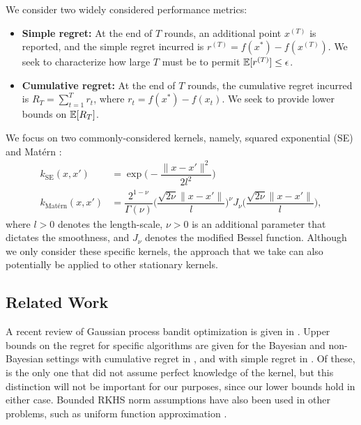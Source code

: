 \documentclass[english,onecolumn,final,11pt]{IEEEtran} %
\newcommand{\kSE}{k_{\text{SE}}}
\newcommand{\kMat}{k_{\text{Mat\'ern}}}
\begin{document}
We consider two widely considered performance metrics:
\begin{itemize}
    \item {\bf Simple regret:} At the end of $T$ rounds, an additional point $x^{(T)}$ is reported, and the simple regret incurred is $r^{(T)} = f(x^*) - f(x^{(T)})$.  We seek to characterize how large $T$ must be to permit $\mathbb{E}[r^{(T)}] \le \epsilon$.
    \item {\bf Cumulative regret:} At the end of $T$ rounds, the cumulative regret incurred is $R_T = \sum_{t=1}^T r_t$, where $r_t = f(x^*) - f(x_t)$.  We seek to provide lower bounds on $\mathbb{E}[R_T]$.
\end{itemize}

We focus on two commonly-considered kernels, namely, squared exponential (SE) and Mat\'ern \cite{Ras06}: 
\begin{align}
    \kSE(x,x') &= \exp \bigg(- \dfrac{\|x - x'\|^2}{2l^2} \bigg) \label{eq:kSE} \\ 
    \kMat(x,x') &= \dfrac{2^{1-\nu}}{\Gamma(\nu)} \bigg(\dfrac{\sqrt{2\nu}\|x - x'\|}{l}\bigg)^{\nu}  J_{\nu}\bigg(\dfrac{\sqrt{2 \nu}\|x - x'\|}{l} \bigg), \label{eq:kMat}
    \end{align}
where $l>0$ denotes the length-scale, $\nu > 0$ is an additional parameter that dictates the smoothness,  and $J_{\nu}$ denotes the modified Bessel function.  Although we only consider these specific kernels, the approach that we take can also potentially be applied to other stationary kernels.

\subsection{Related Work} \label{sec:previous_work}

A recent review of Gaussian process bandit optimization is given in \cite{Sha16}. Upper bounds on the regret for specific algorithms are given for the Bayesian and non-Bayesian settings with cumulative regret in \cite{Sri09,Wan14a,Rus14}, and with simple regret in \cite{Con13,Bog16a}.  Of these, \cite{Wan14a} is the only one that did not assume perfect knowledge of the kernel, but this distinction will not be important for our purposes, since our lower bounds hold in either case.  Bounded RKHS norm assumptions have also been used in other problems, such as uniform function approximation \cite{Ras12,Ras14}.  
\end{document}
